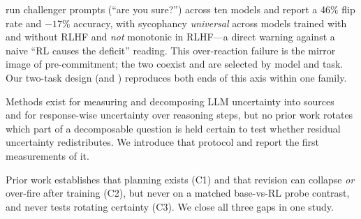  \citet{laban2023flipflop} run
challenger prompts (``are you sure?'') across ten models and report a 46\% flip rate and
$-17\%$ accuracy, with sycophancy \emph{universal} across models trained with and without
RLHF and \emph{not} monotonic in RLHF---a direct warning against a naive ``RL causes the
deficit'' reading. This over-reaction failure is the mirror image of pre-commitment; the two
coexist and are selected by model and task. Our two-task design (\arc and \gsm) reproduces
both ends of this axis within one family.

 Methods exist for measuring and decomposing LLM
uncertainty into sources~\citep{uncertaintyprofiles2025} and for response-wise uncertainty
over reasoning steps, but no prior work rotates which part of a decomposable question is held
certain to test whether residual uncertainty redistributes. We introduce that protocol and
report the first measurements of it.

 Prior work establishes that planning exists (C1) and that revision can
collapse \emph{or} over-fire after training (C2), but never on a matched base-vs-RL probe
contrast, and never tests rotating certainty (C3). We close all three gaps in one study.
